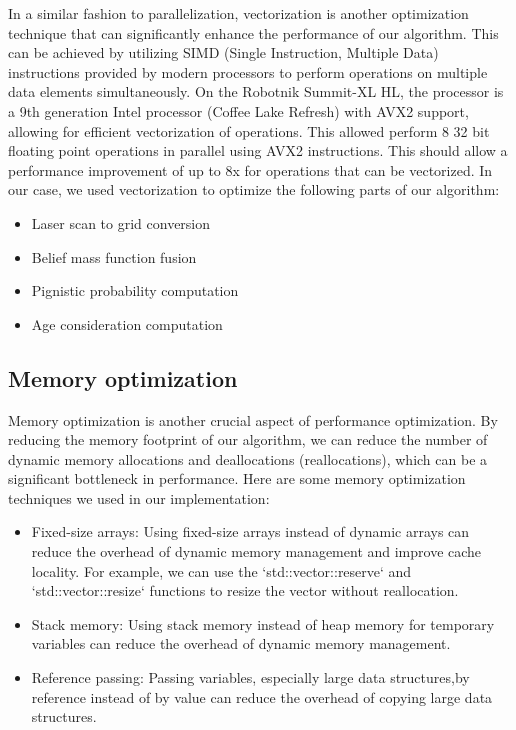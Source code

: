 In a similar fashion to parallelization, vectorization is another optimization technique that can significantly enhance the performance of our algorithm.
This can be achieved by utilizing SIMD (Single Instruction, Multiple Data) instructions provided by modern processors to perform operations on multiple data elements simultaneously.
On the Robotnik Summit-XL HL, the processor is a 9th generation Intel processor (Coffee Lake Refresh) with AVX2 support, allowing for efficient vectorization of operations.
This allowed perform 8 32 bit floating point operations in parallel using AVX2 instructions.
This should allow a performance improvement of up to 8x for operations that can be vectorized.
In our case, we used vectorization to optimize the following parts of our algorithm:
\begin{itemize}
    \item Laser scan to grid conversion
    \item Belief mass function fusion
    \item Pignistic probability computation
    \item Age consideration computation
\end{itemize}

\subsection{Memory optimization}

Memory optimization is another crucial aspect of performance optimization.
By reducing the memory footprint of our algorithm, we can reduce the number of dynamic memory allocations and deallocations (reallocations), which can be a significant bottleneck in performance.
Here are some memory optimization techniques we used in our implementation:
\begin{itemize}
    \item Fixed-size arrays: Using fixed-size arrays instead of dynamic arrays can reduce the overhead of dynamic memory management and improve cache locality.
          For example, we can use the `std::vector::reserve` and  `std::vector::resize` functions to resize the vector without reallocation.
    \item Stack memory: Using stack memory instead of heap memory for temporary variables can reduce the overhead of dynamic memory management.
    \item Reference passing: Passing variables, especially large data structures,by reference instead of by value can reduce the overhead of copying large data structures.
\end{itemize}
